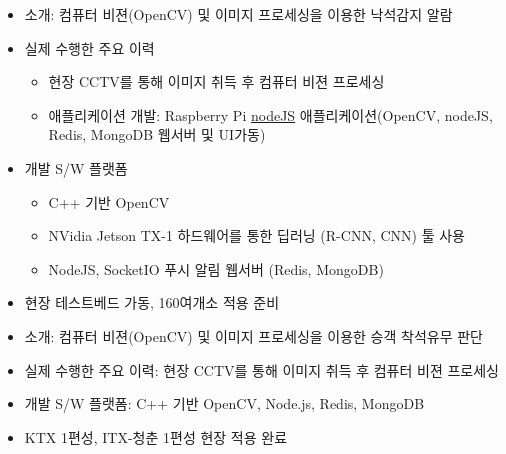 \documentclass[10pt,a4paper,ragged2e]{altacv}
\begin{document}
\begin{fullwidth}
\divider


\begin{itemize}
\item
  소개: 컴퓨터 비젼(OpenCV) 및 이미지 프로세싱을 이용한 낙석감지 알람
\item 실제 수행한 주요 이력
  \begin{itemize}
    \item 현장 CCTV를 통해 이미지 취득 후 컴퓨터 비젼 프로세싱
    \item 애플리케이션 개발: Raspberry Pi \href{https://nodejs.org}{nodeJS} 애플리케이션(OpenCV, nodeJS, Redis, MongoDB 웹서버 및 UI가동)
  \end{itemize}
\item 개발 S/W 플랫폼
  \begin{itemize}
    \item C++ 기반 OpenCV
    \item NVidia Jetson TX-1 하드웨어를 통한 딥러닝 (R-CNN, CNN) 툴 사용
    \item NodeJS, SocketIO 푸시 알림 웹서버 (Redis, MongoDB)
  \end{itemize}
\item 현장 테스트베드 가동, 160여개소 적용 준비
\end{itemize}

\divider


\begin{itemize}
\item 소개: 컴퓨터 비젼(OpenCV) 및 이미지 프로세싱을 이용한 승객 착석유무 판단
\item 실제 수행한 주요 이력: 현장 CCTV를 통해 이미지 취득 후 컴퓨터 비젼 프로세싱
\item 개발 S/W 플랫폼: C++ 기반 OpenCV, Node.js, Redis, MongoDB
\item KTX 1편성, ITX-청춘 1편성 현장 적용 완료
\end{itemize}

\divider



\end{fullwidth}
\end{document}
